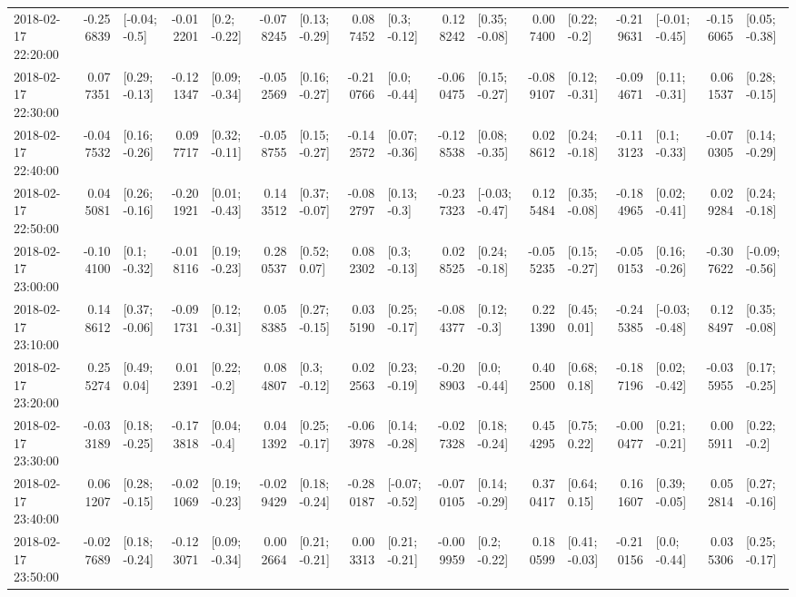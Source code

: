 \begin{tabular}{lrlrlrlrlrlrlrlrl}
2018-02-17 22:20:00 & -0.256839 &   [-0.04; -0.5] & -0.012201 &    [0.2; -0.22] & -0.078245 &   [0.13; -0.29] &  0.087452 &    [0.3; -0.12] &  0.128242 &   [0.35; -0.08] &  0.007400 &    [0.22; -0.2] & -0.219631 &  [-0.01; -0.45] & -0.156065 &   [0.05; -0.38] \\
2018-02-17 22:30:00 &  0.077351 &   [0.29; -0.13] & -0.121347 &   [0.09; -0.34] & -0.052569 &   [0.16; -0.27] & -0.210766 &    [0.0; -0.44] & -0.060475 &   [0.15; -0.27] & -0.089107 &   [0.12; -0.31] & -0.094671 &   [0.11; -0.31] &  0.061537 &   [0.28; -0.15] \\
2018-02-17 22:40:00 & -0.047532 &   [0.16; -0.26] &  0.097717 &   [0.32; -0.11] & -0.058755 &   [0.15; -0.27] & -0.142572 &   [0.07; -0.36] & -0.128538 &   [0.08; -0.35] &  0.028612 &   [0.24; -0.18] & -0.113123 &    [0.1; -0.33] & -0.070305 &   [0.14; -0.29] \\
2018-02-17 22:50:00 &  0.045081 &   [0.26; -0.16] & -0.201921 &   [0.01; -0.43] &  0.143512 &   [0.37; -0.07] & -0.082797 &    [0.13; -0.3] & -0.237323 &  [-0.03; -0.47] &  0.125484 &   [0.35; -0.08] & -0.184965 &   [0.02; -0.41] &  0.029284 &   [0.24; -0.18] \\
2018-02-17 23:00:00 & -0.104100 &    [0.1; -0.32] & -0.018116 &   [0.19; -0.23] &  0.280537 &    [0.52; 0.07] &  0.082302 &    [0.3; -0.13] &  0.028525 &   [0.24; -0.18] & -0.055235 &   [0.15; -0.27] & -0.050153 &   [0.16; -0.26] & -0.307622 &  [-0.09; -0.56] \\
2018-02-17 23:10:00 &  0.148612 &   [0.37; -0.06] & -0.091731 &   [0.12; -0.31] &  0.058385 &   [0.27; -0.15] &  0.035190 &   [0.25; -0.17] & -0.084377 &    [0.12; -0.3] &  0.221390 &    [0.45; 0.01] & -0.245385 &  [-0.03; -0.48] &  0.128497 &   [0.35; -0.08] \\
2018-02-17 23:20:00 &  0.255274 &    [0.49; 0.04] &  0.012391 &    [0.22; -0.2] &  0.084807 &    [0.3; -0.12] &  0.022563 &   [0.23; -0.19] & -0.208903 &    [0.0; -0.44] &  0.402500 &    [0.68; 0.18] & -0.187196 &   [0.02; -0.42] & -0.035955 &   [0.17; -0.25] \\
2018-02-17 23:30:00 & -0.033189 &   [0.18; -0.25] & -0.173818 &    [0.04; -0.4] &  0.041392 &   [0.25; -0.17] & -0.063978 &   [0.14; -0.28] & -0.027328 &   [0.18; -0.24] &  0.454295 &    [0.75; 0.22] & -0.000477 &   [0.21; -0.21] &  0.005911 &    [0.22; -0.2] \\
2018-02-17 23:40:00 &  0.061207 &   [0.28; -0.15] & -0.021069 &   [0.19; -0.23] & -0.029429 &   [0.18; -0.24] & -0.280187 &  [-0.07; -0.52] & -0.070105 &   [0.14; -0.29] &  0.370417 &    [0.64; 0.15] &  0.161607 &   [0.39; -0.05] &  0.052814 &   [0.27; -0.16] \\
2018-02-17 23:50:00 & -0.027689 &   [0.18; -0.24] & -0.123071 &   [0.09; -0.34] &  0.002664 &   [0.21; -0.21] &  0.003313 &   [0.21; -0.21] & -0.009959 &    [0.2; -0.22] &  0.180599 &   [0.41; -0.03] & -0.210156 &    [0.0; -0.44] &  0.035306 &   [0.25; -0.17] \\
\bottomrule
\end{tabular}
